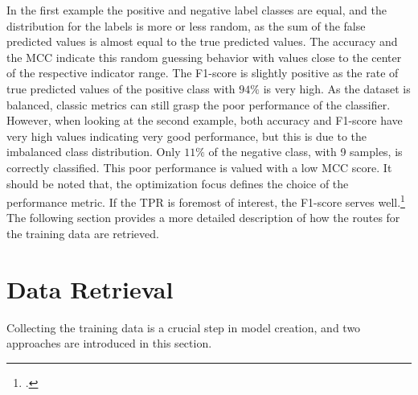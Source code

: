In the first example the positive and negative label classes are equal, and the distribution for the
labels is more or less random, as the sum of the false predicted values is almost equal to
the true predicted values. The accuracy and the \gls{MCC} indicate this random guessing
behavior with values close to the center of the respective indicator range.
The F1-score is slightly positive as the rate of true predicted values of the positive class
with $94\%$ is very high. As the dataset is balanced, classic metrics can still grasp
the poor performance of the classifier. However, when looking at the second example, both
accuracy and F1-score have very high values indicating very good performance, but this is
due to the imbalanced class distribution. Only $11\%$ of the negative class, with 9 samples,
is correctly classified. This poor performance is valued with a low \gls{MCC} score.
It should be noted that, the optimization focus defines the choice of the performance metric.
If the \gls{TPR} is foremost of interest, the F1-score serves well.\footcite[cf.][p. 8f]{chicco_advantages_2020}
The following section provides a more detailed description of how the routes for the training data are retrieved.

\section{Data Retrieval}
\label{sec:DataRetrieval}

Collecting the training data is a crucial step in model creation, and two approaches are introduced in this section.

